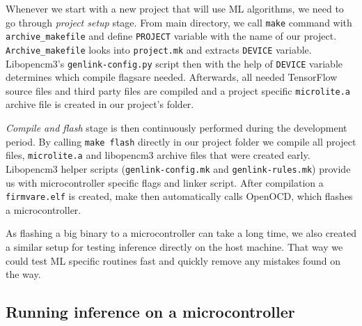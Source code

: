 Whenever we start with a new project that will use ML algorithms, we need to go through \textit{project setup} stage.
From main directory, we call \verb|make| command with \verb|archive_makefile| and define \verb|PROJECT| variable with the name of our project.
\verb|Archive_makefile| looks into \verb|project.mk| and extracts \verb|DEVICE| variable.
Libopencm3's \verb|genlink-config.py| script then with the help of \verb|DEVICE| variable determines which compile flags\footnotemark are needed. 
Afterwards, all needed TensorFlow source files and third party files are compiled and a project specific \verb|microlite.a| archive file is created in our project's folder.

\textit{Compile and flash} stage is then continuously performed during the development period.
By calling \verb|make flash| directly in our project folder we compile all project files, \verb|microlite.a| and libopencm3 archive files that were created early.
Libopencm3 helper scripts (\verb|genlink-config.mk| and \verb|genlink-rules.mk|) provide us with microcontroller specific flags and linker script.
After compilation a \verb|firmvare.elf| is created, make then automatically calls OpenOCD, which flashes a microcontroller.

As flashing a big binary to a microcontroller can take a long time, we also created a similar setup for testing inference directly on the host machine.
That way we could test ML specific routines fast and quickly remove any mistakes found on the way.


\subsection{ Running inference on a microcontroller}

